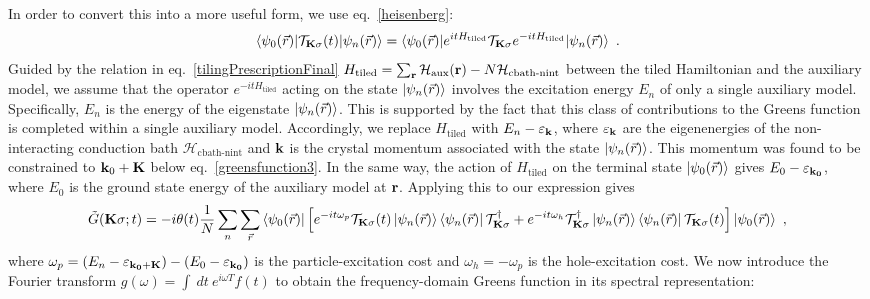 \documentclass[reprint,hidelinks,onecolumn]{revtex4-2}
\begin{document}
In order to convert this into a more useful form, we use eq.~\ref{heisenberg}:
\begin{equation}\begin{aligned}
		\braket{\psi_{0}(\vec r) | \mathcal{T}_{{\bf K}\sigma}(t) | \psi_n(\vec r)} = \braket{\psi_{0}(\vec r) | e^{it H_\text{tiled} }\mathcal{T}_{{\bf K}\sigma}e^{-i t H_\text{tiled}} | \psi_n(\vec r)}~.
\end{aligned}\end{equation}
Guided by the relation in eq.~\ref{tilingPrescriptionFinal} \(H_\text{tiled} = \sum_{{\bf r}}\mathcal{H}_\text{aux}({\bf r}) - N\mathcal{H}_\text{cbath-nint}\) between the tiled Hamiltonian and the auxiliary model, we assume that the operator \(e^{-i t H_\text{tiled}}\) acting on the state \(\ket{\psi_n(\vec r)}\) involves the excitation energy \(E_n\) of only a single auxiliary model. Specifically, \(E_n\) is the energy of the eigenstate \(\ket{\psi_n(\vec r)}\). This is supported by the fact that this class of contributions to the Greens function is completed within a single auxiliary model. Accordingly, we replace \(H_\text{tiled}\) with \(E_n - \varepsilon_{\bf k} \), where \(\varepsilon_{\bf k}\) are the eigenenergies of the non-interacting conduction bath \(\mathcal{H}_\text{cbath-nint}\) and \({\bf k}\) is the crystal momentum associated with the state \(\ket{\psi_n(\vec r)}\). This momentum was found to be constrained to \({\bf k}_0 + {\bf K}\) below eq.~\ref{greensfunction3}. In the same way, the action of \(H_\text{tiled}\) on the terminal state \(\ket{\psi_{0}(\vec r)}\) gives \(E_0 - \varepsilon_{\bf k_0}\), where \(E_0\) is the ground state energy of the auxiliary model at \({\bf r}\). Applying this to our expression gives
\begin{equation}\begin{aligned}
	\tilde G({\bf K}\sigma; t) = -i\theta(t)\frac{1}{N}\sum_n\sum_{\vec r} \braket{\psi_{0}(\vec r) | \left[e^{-it\omega_p} \mathcal{T}_{{\bf K}\sigma}(t) \ket{\psi_n(\vec r)}\bra{\psi_n(\vec r)} \mathcal{T}_{{\bf K}\sigma}^\dagger + e^{-it\omega_h} \mathcal{T}^\dagger_{{\bf K}\sigma} \ket{\psi_n(\vec r)}\bra{\psi_n(\vec r)} \mathcal{T}_{{\bf K}\sigma}(t)\right] | \psi_{0}(\vec r)} ~,
\end{aligned}\end{equation}
where \(\omega_p = (E_n - \varepsilon_{\bf k_0 + \bf K}) - (E_0 - \varepsilon_{\bf k_0})\) is the particle-excitation cost and \(\omega_h = -\omega_p\) is the hole-excitation cost. We now introduce the Fourier transform \(g(\omega) = \int~dt~ e^{i\omega T}f(t)\) to obtain the frequency-domain Greens function in its spectral representation:
\end{document}
